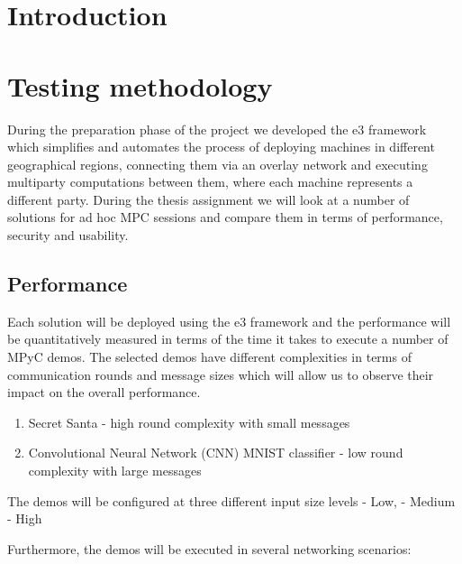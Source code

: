 \tableofcontents

\printnoidxglossary[type=\acronymtype,title=List of Abbreviations]
\listoffigures

\mainmatter

\hypertarget{introduction}{%
\chapter{Introduction}\label{introduction}}

\hypertarget{testing-methodology}{%
\chapter{Testing methodology}\label{testing-methodology}}

During the preparation phase of the project we developed the \gls{e3}
framework which simplifies and automates the process of deploying
machines in different geographical regions, connecting them via an
overlay network and executing multiparty computations between them,
where each machine represents a different party. During the thesis
assignment we will look at a number of solutions for ad hoc MPC sessions
and compare them in terms of performance, security and usability.

\hypertarget{performance}{%
\section{Performance}\label{performance}}

Each solution will be deployed using the \gls{e3} framework and the
performance will be quantitatively measured in terms of the time it
takes to execute a number of MPyC demos. The selected demos have
different complexities in terms of communication rounds and message
sizes which will allow us to observe their impact on the overall
performance.

\begin{enumerate}
\def\labelenumi{\arabic{enumi}.}
\tightlist
\item
  Secret Santa - high round complexity with small messages
\item
  Convolutional Neural Network (CNN) MNIST classifier - low round
  complexity with large messages
\end{enumerate}

The demos will be configured at three different input size levels - Low,
- Medium - High

Furthermore, the demos will be executed in several networking scenarios:

